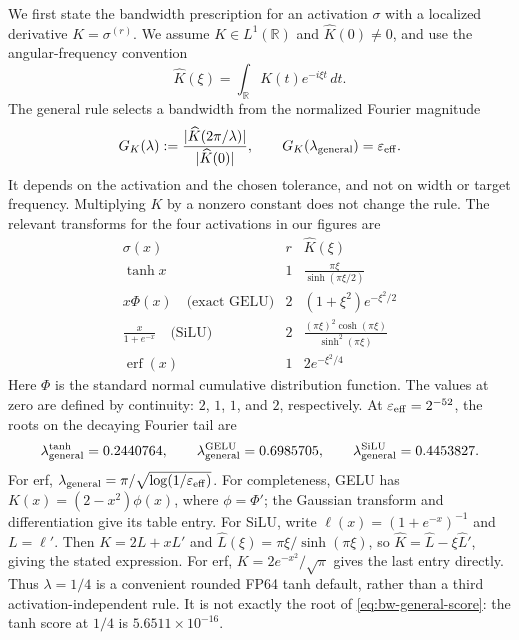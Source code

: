 We first state the bandwidth prescription for an activation $\sigma$ with a
localized derivative $K=\sigma^{(r)}$. We assume $K\in L^1(\mathbb R)$ and
$\widehat K(0)\ne0$, and use the angular-frequency convention
\[
 \widehat K(\xi)=\int_{\mathbb R}K(t)e^{-i\xi t}\,dt.
\]
The general rule selects a bandwidth from the normalized Fourier magnitude
\begin{equation}
 G_K(\lambda):=
 \frac{|\widehat K(2\pi/\lambda)|}{|\widehat K(0)|},
 \qquad
 G_K(\lambda_{\rm general})=\varepsilon_{\rm eff}.
 \label{eq:bw-general-score}
\end{equation}
It depends on the activation and the chosen tolerance, and not on width or
target frequency. Multiplying $K$ by a nonzero constant does not change the
rule. The relevant transforms for the four activations in our figures are
\begin{equation}
\begin{array}{c|c|c}
 \sigma(x)&r&\widehat K(\xi)\\\hline
 \tanh x&1&\displaystyle\frac{\pi\xi}{\sinh(\pi\xi/2)}\\[5pt]
 x\Phi(x)\quad\text{(exact GELU)}&2&
       (1+\xi^2)e^{-\xi^2/2}\\[3pt]
 \displaystyle\frac{x}{1+e^{-x}}\quad\text{(SiLU)}&2&
       \displaystyle\frac{(\pi\xi)^2\cosh(\pi\xi)}{\sinh^2(\pi\xi)}\\[5pt]
 \operatorname{erf}(x)&1&2e^{-\xi^2/4}
\end{array}
\label{eq:bw-three-transforms}
\end{equation}
Here $\Phi$ is the standard normal cumulative distribution function. The
values at zero are defined by continuity: $2$, $1$, $1$, and $2$, respectively.
At $\varepsilon_{\rm eff}=2^{-52}$, the roots on the decaying Fourier tail are
\[
 \lambda_{\rm general}^{\tanh}=0.2440764,\qquad
 \lambda_{\rm general}^{\rm GELU}=0.6985705,\qquad
 \lambda_{\rm general}^{\rm SiLU}=0.4453827.
\]
For erf, $\lambda_{\rm general}=\pi/\sqrt{\log(1/\varepsilon_{\rm eff})}$.
For completeness, GELU has $K(x)=(2-x^2)\phi(x)$, where $\phi=\Phi'$;
the Gaussian transform and differentiation give its table entry. For SiLU,
write $\ell(x)=(1+e^{-x})^{-1}$ and $L=\ell'$. Then
$K=2L+xL'$ and $\widehat L(\xi)=\pi\xi/\sinh(\pi\xi)$, so
$\widehat K=\widehat L-\xi\widehat L'$, giving the stated expression.
For erf, $K=2e^{-x^2}/\sqrt\pi$ gives the last entry directly.
Thus $\lambda=1/4$ is a convenient rounded FP64 tanh default, rather than a
third activation-independent rule. It is not exactly the root of
\eqref{eq:bw-general-score}: the tanh score at $1/4$ is
$5.6511\times10^{-16}$.

